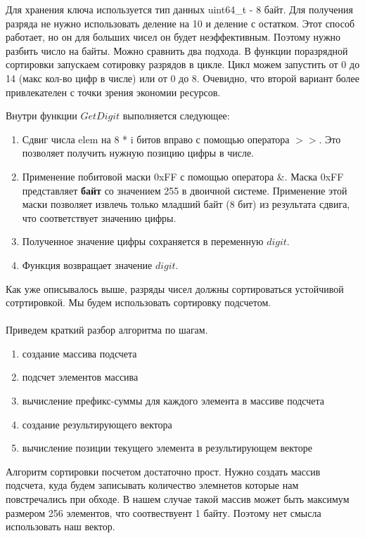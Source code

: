Для хранения ключа используется тип данных uint64\_t - 8 байт.
Для получения разряда не нужно использовать деление на 10 и деление с остатком. Этот способ работает, 
но он для больших чисел он будет неэффективным. Поэтому нужно разбить число на байты. Можно сравнить два подхода.
В функции поразрядной сортировки запускаем сотировку разрядов в цикле. Цикл можем запустить от 0 до 14 (макс кол-во цифр в числе) или от 0 до 8.
Очевидно, что второй вариант более привлекателен с точки зрения экономии ресурсов.

Внутри функции $GetDigit$ выполняется следующее:
\begin{enumerate}
	\item Сдвиг числа elem на 8 * i битов вправо с помощью оператора \(>>\). Это позволяет получить нужную позицию цифры в числе.
	\item Применение побитовой маски 0xFF с помощью оператора \&. Маска 0xFF представляет \textbf{байт} со значением 255 в двоичной системе. Применение этой маски позволяет извлечь только младший байт (8 бит) из результата сдвига, что соответствует значению цифры.
	\item Полученное значение цифры сохраняется в переменную $digit$.
	\item Функция возвращает значение $digit$.
\end{enumerate}


Как уже описывалось выше, разряды чисел должны сортироваться устойчивой сотртировкой. Мы будем использовать сортировку подсчетом.\\\\

Приведем краткий разбор алгоритма по шагам.
\begin{enumerate}
	\item создание массива подсчета
	\item подсчет элементов массива
	\item вычисление префикс-суммы для каждого элемента в массиве подсчета
	\item создание результирующего вектора
	\item вычисление позиции текущего элемента в результирующем векторе
\end{enumerate}


Алгоритм сортировки посчетом достаточно прост. Нужно создать массив подсчета, 
куда будем записывать количество элемнетов которые нам повстречались при обходе.
В нашем случае такой массив может быть максимум размером 256 элементов, что соотвествуент 1 байту.
Поэтому нет смысла использовать наш вектор.\\\\

